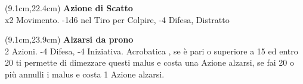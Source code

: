 \documentclass[a4paper,12 pt,openany]{book}
\begin{document}
\begin{textblock*}{6.7cm}(9.1cm,22.4cm) %
\textbf{Azione di Scatto}\\
x2 Movimento. -1d6 nel Tiro per Colpire, -4 Difesa, Distratto
\end{textblock*}

\begin{textblock*}{6.7cm}(9.1cm,23.9cm) %
\textbf{Alzarsi da prono}\\
2 Azioni. -4 Difesa, -4 Iniziativa. Acrobatica , se è pari o superiore a 15 ed entro 20 ti permette di dimezzare questi malus e costa una Azione alzarsi,
se fai 20 o più annulli i malus e costa 1 Azione alzarsi.
\end{textblock*}



	~\newpage
\end{document}
